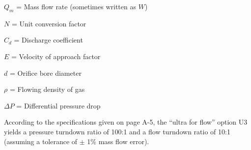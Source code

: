 $Q_m$ = Mass flow rate (sometimes written as $W$)

$N$ = Unit conversion factor

$C_d$ = Discharge coefficient

$E$ = Velocity of approach factor

$d$ = Orifice bore diameter

$\rho$ = Flowing density of gas

$\Delta P$ = Differential pressure drop

\vskip 10pt

According to the specifications given on page A-5, the ``ultra for flow'' option U3 yields a pressure turndown ratio of 100:1 and a flow turndown ratio of 10:1 (assuming a tolerance of $\pm$ 1\% mass flow error).




